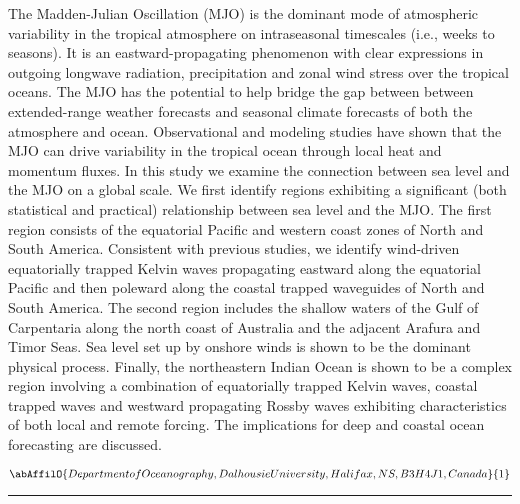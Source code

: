 \noindent The Madden-Julian Oscillation (MJO) is the dominant mode of atmospheric variability in the tropical atmosphere on intraseasonal timescales (i.e., weeks to seasons).  It is an eastward-propagating phenomenon with clear expressions in outgoing longwave radiation, precipitation and zonal wind stress over the tropical oceans.  The MJO has the potential to help bridge the gap between between extended-range weather forecasts and seasonal climate forecasts of both the atmosphere and ocean.  Observational and modeling studies have shown that the MJO can drive variability in the tropical ocean through local heat and momentum fluxes. In this study we examine the connection between sea level and the MJO on a global scale. We first identify regions exhibiting a significant (both statistical and practical) relationship between sea level and the MJO. The first region consists of the equatorial Pacific and western coast zones of North and South America. Consistent with previous studies, we identify wind-driven equatorially trapped Kelvin waves propagating eastward along the equatorial Pacific and then poleward along the coastal trapped waveguides of North and South America.  The second region includes the shallow waters of the Gulf of Carpentaria along the north coast of Australia and the adjacent Arafura and Timor Seas. Sea level set up by onshore winds is shown to be the dominant physical process. Finally, the northeastern Indian Ocean is shown to be a complex region involving a combination of equatorially trapped Kelvin waves, coastal trapped waves and westward propagating Rossby waves exhibiting characteristics of both local and remote forcing. The implications for deep and coastal ocean forecasting are discussed.

\begin{center}
   \vspace{2 mm} \begin{center}
    \vspace{2 mm}\begin{center}
  
  $\abAffilO{Department of Oceanography, Dalhousie University, Halifax, NS, B3H 4J1, Canada}{1}$

  \end{center}
  \vspace{2 mm}
  \end{center}\end{center}
  \begin{center}\rule{0.70\linewidth}{0.5 pt}\end{center}

